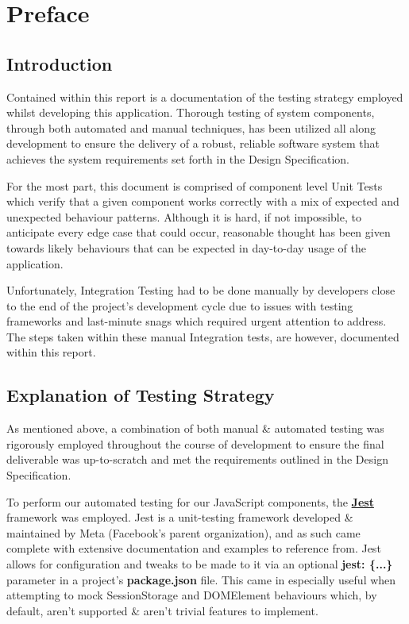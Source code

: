 \section{Preface}

\subsection{Introduction}

Contained within this report is a documentation of the testing strategy employed whilst developing this application. Thorough testing of system components, through both automated and manual techniques, has been utilized all along development to ensure the delivery of a robust, reliable software system that achieves the system requirements set forth in the Design Specification.

For the most part, this document is comprised of component level Unit Tests which verify that a given component works correctly with a mix of expected and unexpected behaviour patterns. Although it is hard, if not impossible, to anticipate every edge case that could occur, reasonable thought has been given towards likely behaviours that can be expected in day-to-day usage of the application. 

Unfortunately, Integration Testing had to be done manually by developers close to the end of the project's development cycle due to issues with testing frameworks and last-minute snags which required urgent attention to address. The steps taken within these manual Integration tests, are however, documented within this report. 

\subsection{Explanation of Testing Strategy}

As mentioned above, a combination of both manual \& automated testing was rigorously employed throughout the course of development to ensure the final deliverable was up-to-scratch and met the requirements outlined in the Design Specification.

To perform our automated testing for our JavaScript components, the {\bf\href{https://jestjs.io/}{Jest}} framework was employed. Jest is a unit-testing framework developed \& maintained by Meta (Facebook's parent organization), and as such came complete with extensive documentation and examples to reference from. Jest allows for configuration and tweaks to be made to it via an optional {\bf jest: \{...\}} parameter in a project's {\bf package.json} file. This came in especially useful when attempting to mock SessionStorage and DOMElement behaviours which, by default, aren't supported \& aren't trivial features to implement. 

